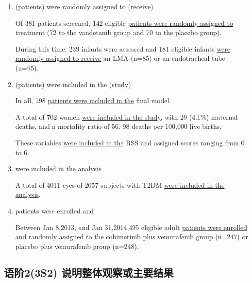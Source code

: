 \documentclass[a4paper]{ctexbook}
\begin{document}
    \begin{enumerate}
      \item (patients) were randomly assigned to (receive)
      \begin{eg}{}
        Of 381 patients screened, 142 eligible \uline{patients were randomly assigned to} treatment (72 to the vandetanib group and 70 to the placebo group).
      \end{eg}

      \begin{eg}{}
        During this time, 239 infants were assessed and 181 eligible infants \uline{were randomly assigned to receive} an LMA (n=85) or an endotracheal tube (n=95).    
      \end{eg}

      \item (patients) were included in the (study)
      \begin{eg}{}
        In all, 198 \uline{patients were included in the} final model.
      \end{eg}

      \begin{eg}{}
        A total of 702 women \uline{were included in the study}, with 29 (4.1\%) maternal deaths, and a mortality ratio of 56. 98 deaths per 100,000 live births.  
      \end{eg}

      \begin{eg}{}
        These variables \uline{were included in the} RSS and assigned scores ranging from 0 to 6. 
      \end{eg}

      \item were included in the analysis
      \begin{eg}{}
        A total of 4011 eyes of 2057 subjects with T2DM \uline{were included in the analysis}.
      \end{eg}

      \item patients were enrolled and
      \begin{eg}{}
        Between Jan 8,2013, and Jan 31,2014,495 eligible adult \uline{patients were enrolled and} randomly assigned to the cobimetinib plus vemurafenib group (n=247) or placebo plus vemurafenib group (n=248).   
      \end{eg}
    \end{enumerate}

  \subsection{语阶2(3S2) 说明整体观察或主要结果}
\end{document}
